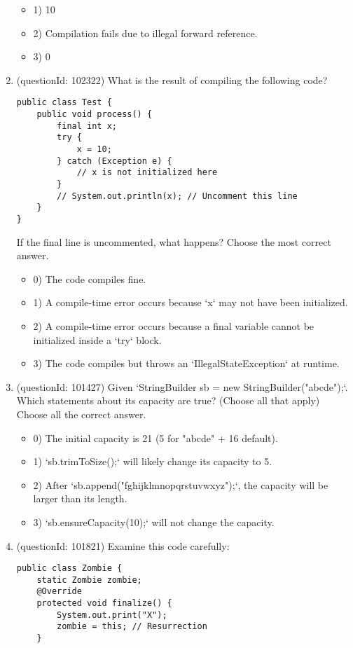\documentclass[12pt]{article}
\begin{document}
\begin{enumerate}[label=(\arabic*)]
\begin{itemize}
\item 1) 10

\item 2) Compilation fails due to illegal forward reference.

\item 3) 0

\end{itemize}
\item (questionId: 102322) What is the result of compiling the following code?\n\begin{verbatim}
public class Test {
    public void process() {
        final int x;
        try {
            x = 10;
        } catch (Exception e) {
            // x is not initialized here
        }
        // System.out.println(x); // Uncomment this line
    }
}
\end{verbatim}
If the final line is uncommented, what happens?
Choose the most correct answer. 
\begin{itemize}
\item 0) The code compiles fine.

\item 1) A compile-time error occurs because `x` may not have been initialized.

\item 2) A compile-time error occurs because a final variable cannot be initialized inside a `try` block.

\item 3) The code compiles but throws an `IllegalStateException` at runtime.

\end{itemize}
\item (questionId: 101427) Given `StringBuilder sb = new StringBuilder("abcde");`. Which statements about its capacity are true? (Choose all that apply)
Choose all the correct answer.\begin{itemize}
\item 0) The initial capacity is 21 (5 for "abcde" + 16 default).

\item 1) `sb.trimToSize();` will likely change its capacity to 5.

\item 2) After `sb.append("fghijklmnopqrstuvwxyz");`, the capacity will be larger than its length.

\item 3) `sb.ensureCapacity(10);` will not change the capacity.

\end{itemize}
\item (questionId: 101821) Examine this code carefully:
\begin{verbatim}
public class Zombie {
    static Zombie zombie;
    @Override
    protected void finalize() {
        System.out.print("X");
        zombie = this; // Resurrection
    }


\end{verbatim}
\end{enumerate}
\end{document}
